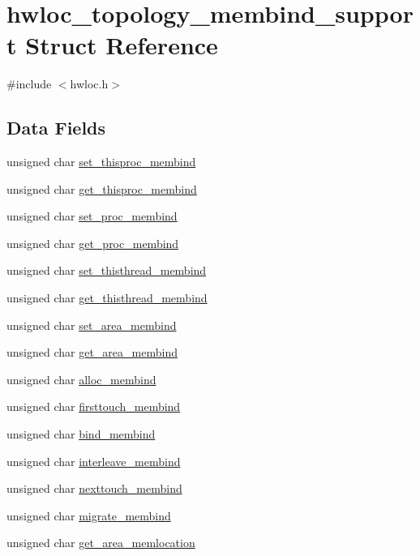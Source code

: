 \hypertarget{a00298}{}\section{hwloc\+\_\+topology\+\_\+membind\+\_\+support Struct Reference}
\label{a00298}


{\ttfamily \#include $<$hwloc.\+h$>$}

\subsection*{Data Fields}
\begin{DoxyCompactItemize}
\item 
unsigned char \hyperlink{a00298_a36b3e388df9c6a249427cab7e3724749}{set\+\_\+thisproc\+\_\+membind}
\item 
unsigned char \hyperlink{a00298_a3fd51e6fa5f0dd800322301b46b08559}{get\+\_\+thisproc\+\_\+membind}
\item 
unsigned char \hyperlink{a00298_a756f44912894b176bf979a1b65f12aac}{set\+\_\+proc\+\_\+membind}
\item 
unsigned char \hyperlink{a00298_a9880cd2d605e316fc020167c49ca69ad}{get\+\_\+proc\+\_\+membind}
\item 
unsigned char \hyperlink{a00298_a0697af2e41f2e82b8ce71e3cc13f7eac}{set\+\_\+thisthread\+\_\+membind}
\item 
unsigned char \hyperlink{a00298_a63b0b2e26157b472f5717ee93cc7c535}{get\+\_\+thisthread\+\_\+membind}
\item 
unsigned char \hyperlink{a00298_a476c06f96b65c08b287cf2369966123b}{set\+\_\+area\+\_\+membind}
\item 
unsigned char \hyperlink{a00298_a0a84e24a06f2fa487fe8c9605c6f68b3}{get\+\_\+area\+\_\+membind}
\item 
unsigned char \hyperlink{a00298_ae551abb27d2aa9ce008583488b845b98}{alloc\+\_\+membind}
\item 
unsigned char \hyperlink{a00298_a221098c339dbfab27bd2c9f5d32f123b}{firsttouch\+\_\+membind}
\item 
unsigned char \hyperlink{a00298_ae7cdb1f1b5f0242a69f85b5a5538c764}{bind\+\_\+membind}
\item 
unsigned char \hyperlink{a00298_a3c44c6012860bbeba8a0f4c19710858d}{interleave\+\_\+membind}
\item 
unsigned char \hyperlink{a00298_ab0921af6e0cd6975812a80b8e5c7435c}{nexttouch\+\_\+membind}
\item 
unsigned char \hyperlink{a00298_aafa7683871a6a760246f9b35209caec5}{migrate\+\_\+membind}
\item 
unsigned char \hyperlink{a00298_a30173553a68e0a4dd1672d26f8e892b1}{get\+\_\+area\+\_\+memlocation}
\end{DoxyCompactItemize}


